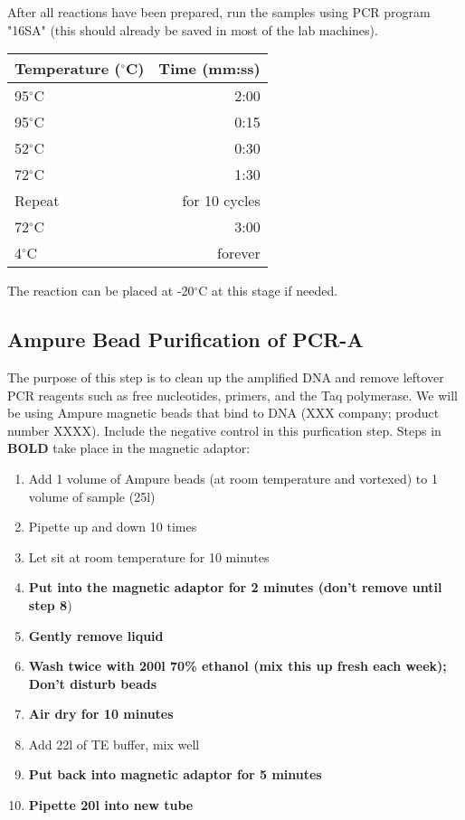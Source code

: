 \documentclass[letterpaper]{article}
\begin{document}
After all reactions have been prepared, run the samples using PCR program "16SA" (this should already be saved in most of the lab machines).

\begin{table}[H]
\centering
\begin{tabular}{l|r}
Temperature ($^{\circ}$C) & Time (mm:ss) \\\hline
95$^{\circ}$C  & 2:00 \\
\hline
95$^{\circ}$C & 0:15 \\
52$^{\circ}$C & 0:30 \\
72$^{\circ}$C & 1:30 \\
Repeat & for 10 cycles \\
\hline
72$^{\circ}$C &3:00 \\
4$^{\circ}$C & forever
\end{tabular}
\end{table}

The reaction can be placed at -20$^{\circ}$C at this stage if needed.


\subsection{Ampure Bead Purification of PCR-A}

The purpose of this step is to clean up the amplified DNA and remove leftover PCR reagents such as free nucleotides, primers, and the Taq polymerase. We will be using Ampure magnetic beads that bind to DNA (XXX company; product number XXXX). Include the negative control in this purfication step. Steps in \textbf{BOLD} take place in the magnetic adaptor:

\begin{enumerate}
\item Add 1 volume of Ampure beads (at room temperature and vortexed) to 1 volume of sample (25\unit{}{\micro}l)
\item Pipette up and down 10 times
\item Let sit at room temperature for 10 minutes
\item \textbf{Put into the magnetic adaptor for 2 minutes (don't remove until step 8})
\item \textbf{Gently remove liquid}
\item \textbf{Wash twice with 200\unit{}{\micro}l 70\% ethanol (mix this up fresh each week); Don't disturb beads}
\item \textbf{Air dry for 10 minutes}
\item Add 22\unit{}{\micro}l of TE buffer, mix well 
\item \textbf{Put back into magnetic adaptor for 5 minutes}
\item \textbf{Pipette 20\unit{}{\micro}l into new tube}
\end{enumerate}
\end{document}
